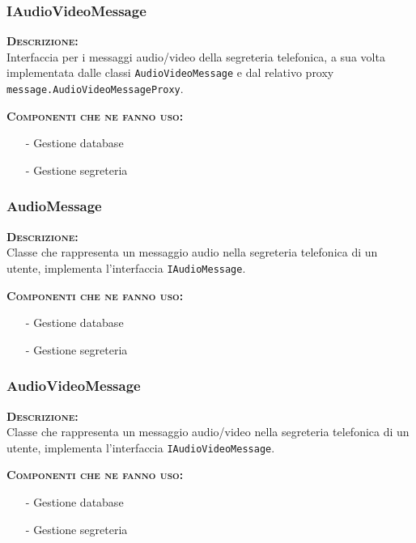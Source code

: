 \subsubsection{IAudioVideoMessage}
\begin{description}
	\item{\scshape\bfseries Descrizione:}\\
Interfaccia per i messaggi audio/video della segreteria telefonica, a sua volta implementata dalle classi \texttt{AudioVideoMessage} e dal relativo proxy \texttt{message.AudioVideoMessageProxy}.
	\item{\scshape\bfseries Componenti che ne fanno uso:} 
	  \begin{itemize}[noitemsep,nolistsep]
	    \item[-] Gestione database
	    \item[-] Gestione segreteria
	  \end{itemize}
\end{description}

\subsubsection{AudioMessage}
\begin{description}
	\item{\scshape\bfseries Descrizione:}\\
Classe che rappresenta un messaggio audio nella segreteria telefonica di un utente, implementa l'interfaccia \texttt{IAudioMessage}.
	\item{\scshape\bfseries Componenti che ne fanno uso:}
	  \begin{itemize}[noitemsep,nolistsep]
	    \item[-] Gestione database
	    \item[-] Gestione segreteria
	  \end{itemize}
\end{description}

\subsubsection{AudioVideoMessage}
\begin{description}
	\item{\scshape\bfseries Descrizione:}\\
Classe che rappresenta un messaggio audio/video nella segreteria telefonica di un utente, implementa l'interfaccia \texttt{IAudioVideoMessage}.
	\item{\scshape\bfseries Componenti che ne fanno uso:}
	  \begin{itemize}[noitemsep,nolistsep]
	    \item[-] Gestione database
	    \item[-] Gestione segreteria
	  \end{itemize}
\end{description}

